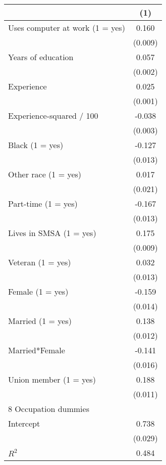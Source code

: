 \begin{tabular}{l*{1}{c}}
\hline\hline
            &\multicolumn{1}{c}{(1)}\\
\hline
Uses computer at work (1 = yes)&       0.160\\
            &     (0.009)\\
Years of education&       0.057\\
            &     (0.002)\\
Experience  &       0.025\\
            &     (0.001)\\
Experience-squared / 100&      -0.038\\
            &     (0.003)\\
Black (1 = yes)&      -0.127\\
            &     (0.013)\\
Other race (1 = yes)&       0.017\\
            &     (0.021)\\
Part-time (1 = yes)&      -0.167\\
            &     (0.013)\\
Lives in SMSA (1 = yes)&       0.175\\
            &     (0.009)\\
Veteran (1 = yes)&       0.032\\
            &     (0.013)\\
Female (1 = yes)&      -0.159\\
            &     (0.014)\\
Married (1 = yes)&       0.138\\
            &     (0.012)\\
Married*Female&      -0.141\\
            &     (0.016)\\
Union member (1 = yes)&       0.188\\
            &     (0.011)\\
8 Occupation dummies&            \\
Intercept   &       0.738\\
            &     (0.029)\\
\hline
\(R^{2}\)   &       0.484\\
\hline\hline
\end{tabular}
